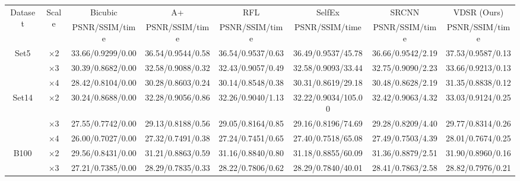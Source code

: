 \documentclass[10pt,twocolumn,letterpaper]{article}
\begin{document}
\begin{table}
\begin{center}
\setlength{\tabcolsep}{2pt}
\footnotesize
\begin{tabular}{ | c | c | c | c | c | c | c | c | }
\hline
\multirow{2}{*}{Dataset} & \multirow{2}{*}{Scale} & Bicubic & A+ & RFL & SelfEx & SRCNN & VDSR (Ours)\\
 & & PSNR/SSIM/time & PSNR/SSIM/time & PSNR/SSIM/time & PSNR/SSIM/time & PSNR/SSIM/time & PSNR/SSIM/time\\
\hline
\hline
\multirow{3}{*}{Set5} & $\times$2 & 33.66/0.9299/0.00 & 36.54/{\color{blue}0.9544}/{\color{blue}0.58} & 36.54/0.9537/0.63 & 36.49/0.9537/45.78 & {\color{blue}36.66}/0.9542/2.19 & {\color{red}37.53}/{\color{red}0.9587}/{\color{red}0.13}\\
 & $\times$3 & 30.39/0.8682/0.00 & 32.58/0.9088/{\color{blue}0.32} & 32.43/0.9057/0.49 & 32.58/{\color{blue}0.9093}/33.44 & {\color{blue}32.75}/0.9090/2.23 & {\color{red}33.66}/{\color{red}0.9213}/{\color{red}0.13}\\
 & $\times$4 & 28.42/0.8104/0.00 & 30.28/0.8603/{\color{blue}0.24} & 30.14/0.8548/0.38 & 30.31/0.8619/29.18 & {\color{blue}30.48}/{\color{blue}0.8628}/2.19 & {\color{red}31.35}/{\color{red}0.8838}/{\color{red}0.12}\\
\hline
\hline
\multirow{3}{*}{Set14} & $\times$2 & 30.24/0.8688/0.00 & 32.28/0.9056/{\color{blue}0.86} & 32.26/0.9040/1.13 & 32.22/0.9034/105.00 & {\color{blue}32.42}/{\color{blue}0.9063}/4.32 & {\color{red}33.03}/{\color{red}0.9124}/{\color{red}0.25}\\
 & $\times$3 & 27.55/0.7742/0.00 & 29.13/0.8188/{\color{blue}0.56} & 29.05/0.8164/0.85 & 29.16/0.8196/74.69 & {\color{blue}29.28}/{\color{blue}0.8209}/4.40 & {\color{red}29.77}/{\color{red}0.8314}/{\color{red}0.26}\\
 & $\times$4 & 26.00/0.7027/0.00 & 27.32/0.7491/{\color{blue}0.38} & 27.24/0.7451/0.65 & 27.40/{\color{blue}0.7518}/65.08 & {\color{blue}27.49}/0.7503/4.39 & {\color{red}28.01}/{\color{red}0.7674}/{\color{red}0.25}\\
\hline
\hline
\multirow{3}{*}{B100} & $\times$2 & 29.56/0.8431/0.00 & 31.21/0.8863/{\color{blue}0.59} & 31.16/0.8840/0.80 & 31.18/0.8855/60.09 & {\color{blue}31.36}/{\color{blue}0.8879}/2.51 & {\color{red}31.90}/{\color{red}0.8960}/{\color{red}0.16}\\
 & $\times$3 & 27.21/0.7385/0.00 & 28.29/0.7835/{\color{blue}0.33} & 28.22/0.7806/0.62 & 28.29/0.7840/40.01 & {\color{blue}28.41}/{\color{blue}0.7863}/2.58 & {\color{red}28.82}/{\color{red}0.7976}/{\color{red}0.21}\\

\end{tabular}
\end{center}
\end{table}
\end{document}
